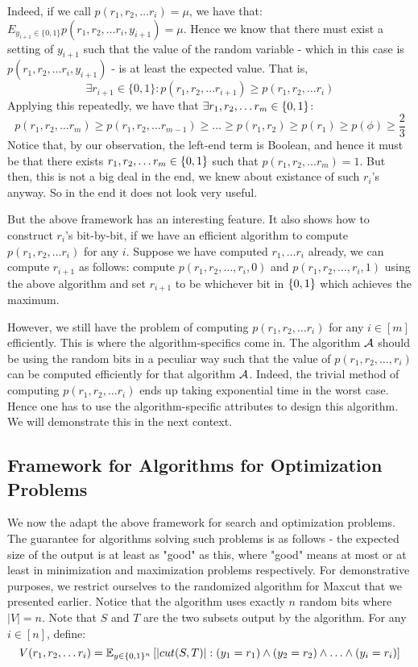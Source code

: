 Indeed, if we call $p(r_1, r_2, \ldots r_i) = \mu$, we have that: $E_{y_{i+1} \in \{0,1\}} p(r_1, r_2, \ldots r_i, y_{i+1}) = \mu$. Hence we know that there must exist a setting of $y_{i+1}$ such that the value of the random variable - which in this case is $p(r_1, r_2, \ldots r_i, y_{i+1})$ - is at least the expected value. That is,
$$\exists r_{i+1} \in \{0,1\} : p(r_1, r_2, \ldots r_{i+1}) \ge p(r_1, r_2, \ldots r_i) $$
Applying this repeatedly, we have that $\exists r_1, r_2, \ldots r_m \in \{0,1\}$:
$$ p(r_1, r_2, \ldots r_m) \ge p(r_1, r_2, \ldots r_{m-1}) \ge \ldots \ge p(r_1, r_2) \ge p(r_1) \ge p(\phi) \ge \frac{2}{3}$$
Notice that, by our observation, the left-end term is Boolean, and hence it must be that there exists $r_1, r_2, \ldots r_m \in \{0,1\}$ such that $p(r_1, r_2, \ldots r_m) = 1$. But then, this is not a big deal in the end, we knew about existance of such $r_i$'s anyway. So in the end it does not look very useful.

But the above framework has an interesting feature. It also shows how to construct $r_i$'s bit-by-bit, if we have an efficient algorithm to compute $p(r_1, r_2, \ldots r_i)$ for any $i$. Suppose we have computed $r_1, \ldots r_i$ already, we can compute $r_{i+1}$ as follows: compute $p(r_1, r_2, \ldots, r_{i}, 0)$ and $p(r_1, r_2, \ldots, r_{i}, 1)$ using the above algorithm and set $r_{i+1}$ to be whichever bit in $\{0,1\}$ which achieves the maximum. 

However, we still have the problem of computing $p(r_1, r_2, \ldots r_i)$ for any $i \in [m]$ efficiently. This is where the algorithm-specifics come in. The algorithm $\cal{A}$ should be using the random bits in a peculiar way such that the value of $p(r_1, r_2, \ldots, r_i)$ can be computed efficiently for that algorithm $\cal{A}$. Indeed, the trivial method of computing $p(r_1, r_2, \ldots r_i)$ ends up taking exponential time in the worst case. Hence one has to use the algorithm-specific attributes to design this algorithm. We will demonstrate this in the next context.

\subsection{Framework for Algorithms for Optimization Problems}

We now the adapt the above framework for search and optimization problems. The guarantee for algorithms solving such problems is as follows - the expected size of the output is at least as "good" as this, where "good" means at most or at least in minimization and maximization problems respectively. For demonstrative purposes, we restrict ourselves to the randomized algorithm for {\sc Maxcut} that we presented earlier. Notice that the algorithm uses exactly $n$ random bits where $|V|=n$. Note that $S$ and $T$ are the two subsets output by the algorithm.
For any $i  \in [n]$, define:
$$V(r_1, r_2, \ldots r_i) = {\mathbb{E}}_{y \in \{0,1\}^n} \left[ |cut(S,T)| : (y_1=r_1) \land (y_2=r_2) \land \ldots \land (y_i = r_i) \right] $$

